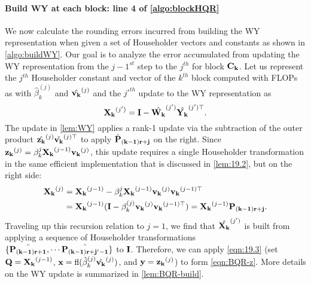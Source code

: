 \paragraph{Build WY at each block: line 4 of \cref{algo:blockHQR}}
We now calculate the rounding errors incurred from building the WY representation when given a set of Householder vectors and constants as shown in \cref{algo:buildWY}.
Our goal is to analyze the error accumulated from updating the WY representation from the $j-1^{st}$ step to the $j^{th}$ for block $\mathbf{C_k}$.
Let us represent the $j^{th}$ Householder constant and vector of the $k^{th}$ block computed with FLOPs as with $\hat{\beta}_k^{(j)}$ and $\hat{\mathbf{v_k}}^{(j)}$ and the $j'^{th}$ update to the WY representation as $$\mathbf{X_k}^{(j')} = \mathbf{I} - \hat{\mathbf{W_k}}^{(j')}\hat{\mathbf{Y_k}}^{(j')\top}.$$ %
The update in \cref{lem:WY} applies a rank-1 update via the subtraction of the outer product $\hat{\mathbf{z_k}}^{(j)}\hat{\mathbf{v_k}}^{(j)\top}$ to apply $\hat{\mathbf{P}}_{\mathbf{(k-1)r+j}}$ on the right. 
Since $\mathbf{z_k}^{(j)} = \beta_k^{j}\mathbf{X_k}^{(j-1)}\mathbf{v_k}^{(j)}$, this update requires a single Householder transformation in the same efficient implementation that is discussed in \cref{lem:19.2}, but on the right side:
\begin{align*}
	\mathbf{X_k}^{(j)} &= \mathbf{X_k}^{(j-1)}-\beta_k^{j}\mathbf{X_k}^{(j-1)}\mathbf{v_k}^{(j)}\mathbf{v_k}^{(j-1)\top} \\
	&= \mathbf{X_k}^{(j-1)} (\mathbf{I}-\beta_k^{(j)}\mathbf{v_k}^{(j)}\mathbf{v_k}^{(j-1)\top})=  \mathbf{X_k}^{(j-1)}\mathbf{P_{(k-1)r+j}}.
\end{align*}
Traveling up this recursion relation to $j=1$, we find that $\hat{\mathbf{X_k}}^{(j')}$ is built from applying a sequence of Householder transformations $\{\hat{\mathbf{P_{(k-1)r+1}}},\cdots \hat{\mathbf{P_{(k-1)r+j'-1}}}\}$ to $\mathbf{I}$.
Therefore, we can apply \cref{eqn:19.3} (set $\mathbf{Q}=\mathbf{X_k}^{(j-1)}$, $\mathbf{x}=\mathrm{fl}(\hat{\beta}_k^{(j)}\hat{\mathbf{v_k}}^{(j)})$, and $\mathbf{y}=\mathbf{z_k}^{(j)}$) to form \cref{eqn:BQR-z}.
More details on the WY update is summarized in \cref{lem:BQR-build}.
